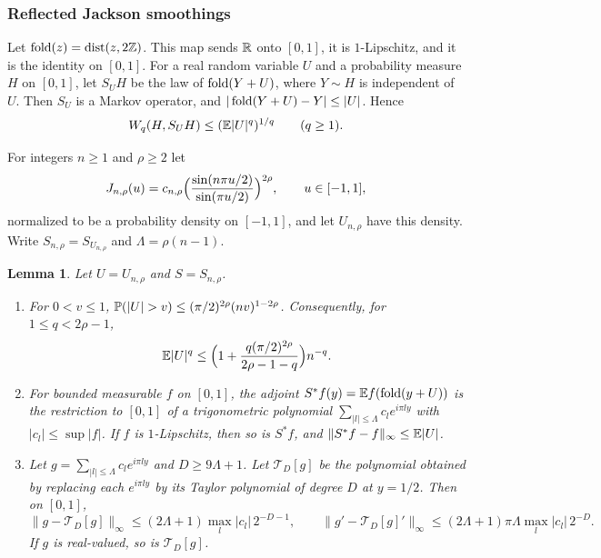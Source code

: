 \documentclass[11pt]{amsart}
\newtheorem{lemma}[theorem]{Lemma}
\theoremstyle{definition}
\theoremstyle{remark}
\begin{document}
\subsubsection{Reflected Jackson smoothings}

Let $\operatorname{fold}(z)=\operatorname{dist}(z,2\mathbb{Z})$.  This map sends $\mathbb{R}$ onto
$[0,1]$, it is $1$-Lipschitz, and it is the identity on $[0,1]$.  For a real
random variable $U$ and a probability measure $H$ on $[0,1]$, let $S_UH$ be
the law of $\operatorname{fold}(Y+U)$, where $Y\sim H$ is independent of $U$.  Then
$S_U$ is a Markov operator, and $|\operatorname{fold}(Y+U)-Y|\le|U|$.  Hence
\begin{equation}\label{R5:eq:smoothcost}
 W_q(H,S_UH)\le(\mathbb{E}|U|^q)^{1/q}\qquad(q\ge1).
\end{equation}

For integers $n\ge1$ and $\rho\ge2$ let
\[
 J_{n,\rho}(u)=c_{n,\rho}\Bigl(\frac{\sin(n\pi u/2)}{\sin(\pi u/2)}\Bigr)^{2\rho},
 \qquad u\in[-1,1],
\]
normalized to be a probability density on $[-1,1]$, and let $U_{n,\rho}$
have this density.  Write $S_{n,\rho}=S_{U_{n,\rho}}$ and
$\Lambda=\rho(n-1)$.

\begin{lemma}\label{R5:lem:kernel}
Let $U=U_{n,\rho}$ and $S=S_{n,\rho}$.
\begin{enumerate}
\item[(i)] For $0<v\le1$, $\RfP(|U|>v)\le(\pi/2)^{2\rho}(nv)^{1-2\rho}$.
 Consequently, for $1\le q<2\rho-1$,
 \[
 \mathbb{E}|U|^q\le\Bigl(1+\frac{q(\pi/2)^{2\rho}}{2\rho-1-q}\Bigr)n^{-q}.
 \]
\item[(ii)] For bounded measurable $f$ on $[0,1]$, the adjoint
 $S^*f(y)=\mathbb{E} f(\operatorname{fold}(y+U))$ is the restriction to $[0,1]$ of a
 trigonometric polynomial $\sum_{|l|\le\Lambda}c_le^{i\pi ly}$ with
 $|c_l|\le\sup|f|$.  If $f$ is $1$-Lipschitz, then so is $S^*f$, and
 $\|S^*f-f\|_\infty\le\mathbb{E}|U|$.
\item[(iii)] Let $g=\sum_{|l|\le\Lambda}c_le^{i\pi ly}$ and $D\ge9\Lambda+1$.
 Let $\mathcal T_D[g]$ be the polynomial obtained by replacing each
 $e^{i\pi ly}$ by its Taylor polynomial of degree $D$ at $y=1/2$.  Then on
 $[0,1]$,
 \[
 \|g-\mathcal T_D[g]\|_\infty\le(2\Lambda+1)\max_l|c_l|\,2^{-D-1},\qquad
 \|g'-\mathcal T_D[g]'\|_\infty\le(2\Lambda+1)\pi\Lambda\max_l|c_l|\,2^{-D}.
 \]
 If $g$ is real-valued, so is $\mathcal T_D[g]$.
\end{enumerate}
\end{lemma}
\end{document}
